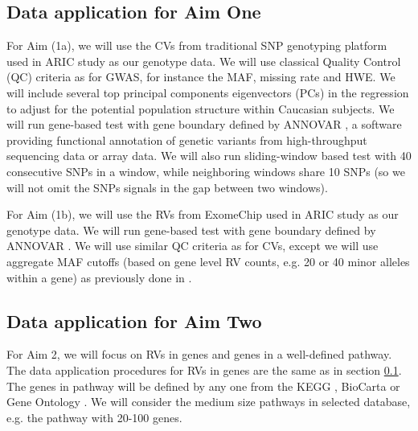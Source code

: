 \documentclass[12pt]{article}
\begin{document}
\subsection{Data application for Aim One}
\label{sec:Data Application-aim1}
For Aim (1a), we will use the CVs from traditional SNP genotyping platform used in ARIC study as our genotype data. We will use classical Quality Control (QC) criteria as for GWAS, for instance the MAF, missing rate and HWE. We will include several top principal components eigenvectors (PCs) in the regression to adjust for the potential population structure within Caucasian subjects. We will run gene-based test with gene boundary defined by ANNOVAR \cite{Wang2010a}, a software providing functional annotation of genetic variants from high-throughput sequencing data or array data.  We will also run sliding-window based test with 40 consecutive SNPs in a window, while neighboring windows share 10 SNPs (so we will not omit the SNPs signals in the gap between two windows). 

For Aim (1b), we will use the RVs from ExomeChip used in ARIC study as our genotype data. We will run gene-based test with gene boundary defined by ANNOVAR \cite{Wang2010a}. We will use similar QC criteria as for CVs, except we will use aggregate MAF cutoffs (based on gene level RV counts, e.g. 20 or 40 minor alleles within a gene) as previously done in \cite{Lange2014,Peloso2014}. 

\subsection{Data application for Aim Two}
\label{sec:Data Application-aim2}
For Aim 2, we will focus on RVs in genes and genes in a well-defined pathway. The data application procedures for RVs in genes are the same as in section \ref{sec:Data Application-aim1}. The genes in pathway will be defined by any one from the KEGG \cite{Ogata1999}, BioCarta \cite{Nishimura2001} or Gene Ontology \cite{Ashburner2000}. We will consider the medium size pathways in selected database, e.g. the pathway with 20-100 genes.



\end{document}
